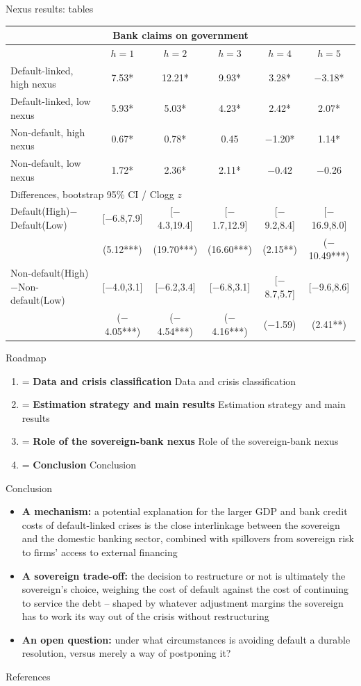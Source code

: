 \documentclass[aspectratio=169]{beamer}
\newcounter{sectionmark}
\newcommand{\roadmapitem}[2]{%
  \ifnum#1=\value{sectionmark}%
    {\bfseries#2}%
  \else
    #2%
  \fi
}
\newcommand{\sectionroadmap}[1]{%
  \setcounter{sectionmark}{#1}%
  \begin{frame}{Roadmap}
    \footnotesize
    \begin{enumerate}
      \item \roadmapitem{1}{Data and crisis classification}
      \item \roadmapitem{2}{Estimation strategy and main results}
      \item \roadmapitem{3}{Role of the sovereign-bank nexus}
      \item \roadmapitem{4}{Conclusion}
    \end{enumerate}
  \end{frame}
}
\begin{document}
\begin{frame}{Nexus results: tables}
  \tiny
  \begin{center}
  \begin{tabular*}{0.92\linewidth}{@{\extracolsep{\fill}}lccccc}
  \multicolumn{6}{c}{\normalsize Bank claims on government} \\
  \toprule
   & $h=1$ & $h=2$ & $h=3$ & $h=4$ & $h=5$ \\
  \midrule
  Default-linked, high nexus & 7.53* & 12.21* & 9.93* & 3.28* & $-$3.18* \\
  Default-linked, low nexus & 5.93* & 5.03* & 4.23* & 2.42* & 2.07* \\
  Non-default, high nexus & 0.67* & 0.78* & 0.45 & $-$1.20* & 1.14* \\
  Non-default, low nexus & 1.72* & 2.36* & 2.11* & $-$0.42 & $-$0.26 \\
  \midrule
  \multicolumn{6}{l}{Differences, bootstrap 95\% CI / Clogg $z$} \\[1pt]
  Default(High)$-$Default(Low) & [$-$6.8,7.9] & [$-$4.3,19.4] & [$-$1.7,12.9] & [$-$9.2,8.4] & [$-$16.9,8.0] \\
   & (5.12***) & (19.70***) & (16.60***) & (2.15**) & ($-$10.49***) \\[2pt]
  Non-default(High)$-$Non-default(Low) & [$-$4.0,3.1] & [$-$6.2,3.4] & [$-$6.8,3.1] & [$-$8.7,5.7] & [$-$9.6,8.6] \\
   & ($-$4.05***) & ($-$4.54***) & ($-$4.16***) & ($-$1.59) & (2.41**) \\
  \bottomrule
  \end{tabular*}
  \end{center}
\end{frame}


\sectionroadmap{4}

\begin{frame}{Conclusion}
 \footnotesize
  \begin{itemize}
    \item \textbf{A mechanism:} a potential explanation for the
    larger GDP and bank credit costs of default-linked crises is the
    close interlinkage between the sovereign and the domestic
    banking sector, combined with spillovers from sovereign risk to
    firms' access to external financing
    \item \textbf{A sovereign trade-off:} the decision to restructure
    or not is ultimately the sovereign's choice, weighing the cost of
    default against the cost of continuing to service the debt --
    shaped by whatever adjustment margins the sovereign has to work
    its way out of the crisis without restructuring
    \item \textbf{An open question:} under what circumstances is
    avoiding default a durable resolution, versus merely a way of
    postponing it?
  \end{itemize}
\end{frame}

\begin{frame}[allowframebreaks]{References}
  \footnotesize
  
  
\end{frame}
\end{document}
